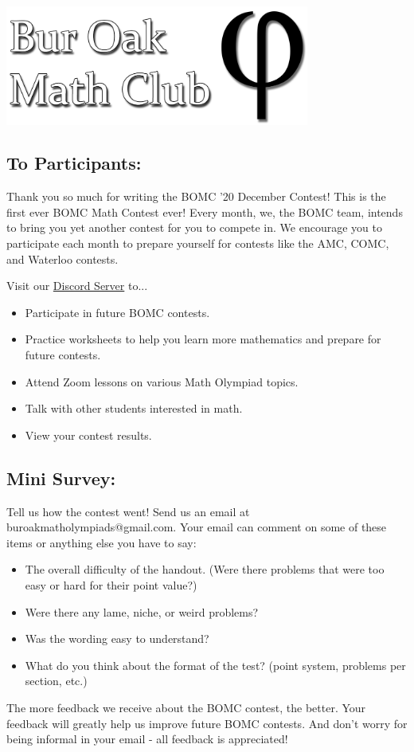 \documentclass[12pt]{article}
\begin{document}

\newpage

\begin{center}
       \includegraphics[width=10cm]{Bur Oak Math Club Banner Bold.png}
\end{center}

\subsection*{To Participants:}
Thank you so much for writing the BOMC '20 December Contest! This is the first ever BOMC Math Contest ever! Every month, we, the BOMC team, intends to bring you yet another contest for you to compete in. We encourage you to participate each month to prepare yourself for contests like the AMC, COMC, and Waterloo contests.\bigskip

Visit our \href{https://discord.gg/QkdPFaNxgQ}{Discord Server} to...
\begin{itemize}
    \item Participate in future BOMC contests.
    \item Practice worksheets to help you learn more mathematics and prepare for future contests.
    \item Attend Zoom lessons on various Math Olympiad topics.
    \item Talk with other students interested in math.
    \item View your contest results.
\end{itemize}

\subsection*{Mini Survey:}
Tell us how the contest went! Send us an email at buroakmatholympiads@gmail.com. Your email can comment on some of these items or anything else you have to say:
\begin{itemize}
    \item The overall difficulty of the handout. (Were there problems that were too easy or hard for their point value?)
    \item Were there any lame, niche, or weird problems? 
    \item Was the wording easy to understand?
    \item What do you think about the format of the test? (point system, problems per section, etc.)
\end{itemize}

The more feedback we receive about the BOMC contest, the better. Your feedback will greatly help us improve future BOMC contests. And don't worry for being informal in your email - all feedback is appreciated!
\end{document}
